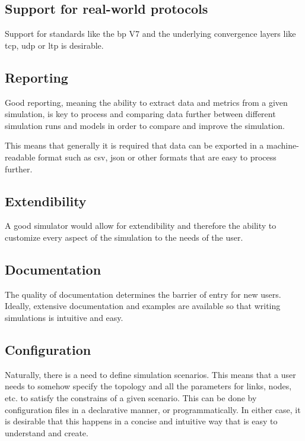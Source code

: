\subsection{Support for real-world protocols}

Support for standards like the \ac{bp} V7 and the underlying convergence layers like \ac{tcp}, \ac{udp} or \ac{ltp} is desirable.

\subsection{Reporting}

Good reporting, meaning the ability to extract data and metrics from a given simulation, is key to process and comparing data further between different simulation runs and models in order to compare and improve the simulation.

This means that generally it is required that data can be exported in a machine-readable format such as csv, json or other formats that are easy to process further.

\subsection{Extendibility}

A good simulator would allow for extendibility and therefore the ability to customize every aspect of the simulation to the needs of the user.

\subsection{Documentation}

The quality of documentation determines the barrier of entry for new users. Ideally, extensive documentation and examples are available so that writing simulations is intuitive and easy.

\subsection{Configuration}

Naturally, there is a need to define simulation scenarios. This means that a user needs to somehow specify the topology and all the parameters for links, nodes, etc. to satisfy the constrains of a given scenario. This can be done by configuration files in a declarative manner, or programmatically. In either case, it is desirable that this happens in a concise and intuitive way that is easy to understand and create.

